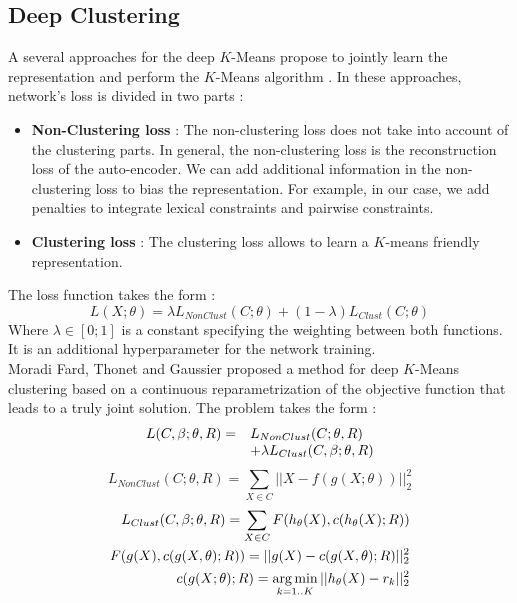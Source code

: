 \subsection{\label{seq:DeepClust}Deep Clustering}
A several approaches for the deep $K$-Means propose to jointly learn the
representation and perform the $K$-Means algorithm \cite{2018arXiv180107648A}.
In these approaches, network's loss is divided in two parts :
\begin{itemize}
\item \textbf{Non-Clustering loss} : The non-clustering loss does not
  take into account of the clustering parts. In general, the non-clustering 
  loss is the reconstruction loss of the auto-encoder. We can add additional 
  information in the non-clustering loss to bias the representation. For
  example, in our case, we add penalties to integrate lexical constraints
  and pairwise constraints.
\item \textbf{Clustering loss} : The clustering loss allows to learn a
  $K$-means friendly representation.
\end{itemize}
The loss function takes the form :
\begin{equation}
L(X;\theta) = \lambda L_{NonClust}(C;\theta) + (1-\lambda)L_{Clust}(C; \theta)
\end{equation}
Where $\lambda \in [0 ; 1]$ is a constant specifying the weighting between both 
functions.
It is an additional hyperparameter for the network training.\\
Moradi Fard, Thonet and Gaussier \cite{Deap-K-Means} proposed a method for deep $K$-Means 
clustering based on a continuous reparametrization of the objective function 
that leads to a truly joint solution. 
The problem takes the form : 
\begin{equation}
\begin{array}{l l}
L(C ,\beta;\theta,R) = & L_{NonClust}(C;\theta,R ) \\ 
                       & + \lambda L_{Clust}(C,\beta;\theta,R)
\end{array}
\end{equation}
\begin{equation}
L_{NonClust}(C;\theta,R ) = \sum\limits_{X \in C} ||X - f(g(X;\theta))||_2^2
\end{equation}
\begin{equation}
\begin{aligned}
  L_{Clust}(C,\beta;\theta,R) = \sum\limits_{X \in C}F(h_\theta(X),c(h_\theta(X); R))\\
  F(g(X),c(g(X, \theta); R)) = ||g(X) - c(g(X, \theta); R) ||_2^2\\
  c(g(X; \theta); R) = \operatorname*{arg\,min}_{k = 1 .. K} || h_\theta(X) - r_k||_2^2
\end{aligned}
\end{equation}
